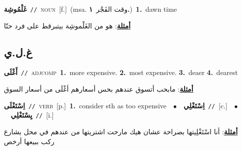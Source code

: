 \documentclass[10pt,a4paper,twoside]{article} %
\begin{document}
\begin{multicols}{2}
{\setlength\topsep{0pt}\textbf{\foreignlanguage{arabic}{غَلْمُوشِة}}\ {\color{gray}\texttt{//}\color{black}}\ \textsc{noun}\ [f.]\ \color{gray}(msa. \foreignlanguage{arabic}{وقت الفَجْر}~\foreignlanguage{arabic}{\textbf{١.}})\color{black}\ \textbf{1.}~dawn time\  \begin{flushright}\color{gray}\foreignlanguage{arabic}{\textbf{\underline{\foreignlanguage{arabic}{أمثلة}}}: هو من الغَلْموشِة بيتبرقط على فرد حنّا}\end{flushright}\color{black}} \vspace{2mm}

\vspace{-3mm}
\subsection*{\color{blue}\foreignlanguage{arabic}{غ.ل.ي}\color{blue}{}} 

{\setlength\topsep{0pt}\textbf{\foreignlanguage{arabic}{أَغْلَى}}\ {\color{gray}\texttt{//}\color{black}}\ \textsc{adj\textunderscore comp}\ \textbf{1.}~more expensive.  \textbf{2.}~most expensive.  \textbf{3.}~deaer  \textbf{4.}~dearest\  \begin{flushright}\color{gray}\foreignlanguage{arabic}{\textbf{\underline{\foreignlanguage{arabic}{أمثلة}}}: مابحب أتسوق عندهم بحس أسعارهم أغْلَى من أسعار السوق}\end{flushright}\color{black}} \vspace{2mm}

{\setlength\topsep{0pt}\textbf{\foreignlanguage{arabic}{اِسْتَغْلَى}}\ {\color{gray}\texttt{//}\color{black}}\ \textsc{verb}\ [p.]\ \textbf{1.}~consider sth as too expensive\ \ $\bullet$\ \ \setlength\topsep{0pt}\textbf{\foreignlanguage{arabic}{اِسْتَغْلِي}}\ {\color{gray}\texttt{//}\color{black}}\ [c.]\ \ $\bullet$\ \ \setlength\topsep{0pt}\textbf{\foreignlanguage{arabic}{يِسْتَغْلِي}}\ {\color{gray}\texttt{//}\color{black}}\ [i.]\  \begin{flushright}\color{gray}\foreignlanguage{arabic}{\textbf{\underline{\foreignlanguage{arabic}{أمثلة}}}: أنا اسْتَغْلِيتها بصراحة عشان هيك مارحت اشتريتها من عندهم في محل بشارع ركب ببيعها أرخص}\end{flushright}\color{black}} \vspace{2mm}


\end{multicols}
\end{document}
